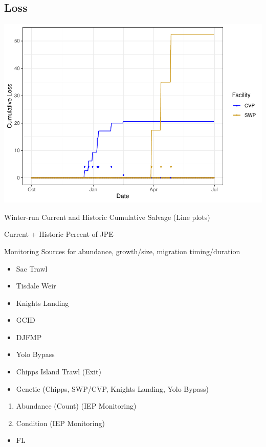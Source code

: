 \documentclass[
]{book}
\providecommand{\tightlist}{%
  \setlength{\itemsep}{0pt}\setlength{\parskip}{0pt}}
\theoremstyle{definition}
\theoremstyle{definition}
\theoremstyle{definition}
\theoremstyle{definition}
\theoremstyle{remark}
\begin{document}
\hypertarget{loss}{%
\subsection{Loss}\label{loss}}

\includegraphics{_main_files/figure-latex/unnamed-chunk-49-1.pdf}

Winter-run Current and Historic Cumulative Salvage (Line plots)

Current + Historic Percent of JPE

Monitoring Sources for abundance, growth/size, migration timing/duration

\begin{itemize}
\tightlist
\item
  Sac Trawl
\item
  Tisdale Weir
\item
  Knights Landing
\item
  GCID
\item
  DJFMP
\item
  Yolo Bypass
\item
  Chipps Island Trawl (Exit)
\item
  Genetic (Chipps, SWP/CVP, Knights Landing, Yolo Bypass)
\end{itemize}

\begin{enumerate}
\def\labelenumi{\arabic{enumi}.}
\item
  Abundance (Count) (IEP Monitoring)
\item
  Condition (IEP Monitoring)
\end{enumerate}

\begin{itemize}
\tightlist
\item
  FL
\end{itemize}
\end{document}
